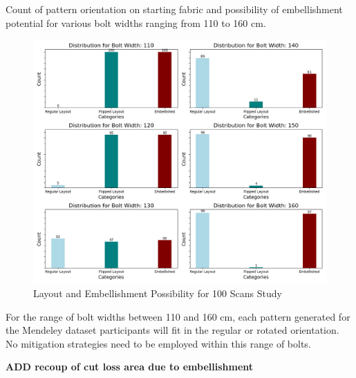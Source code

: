 Count of pattern orientation on starting fabric and possibility of embellishment potential for various bolt widths ranging from 110 to 160 cm.
\begin{figure} [H] %
    \centering %
    \includegraphics[width = \textwidth]{Images/Mendeley_Bar.png} %
    \caption{Layout and Embellishment Possibility for 100 Scans Study}
\end{figure}
For the range of bolt widths between 110 and 160 cm, each pattern generated for the Mendeley dataset participants will fit in the regular or rotated orientation. No mitigation strategies need to be employed within this range of bolts.

\textbf{ADD recoup of cut loss area due to embellishment}